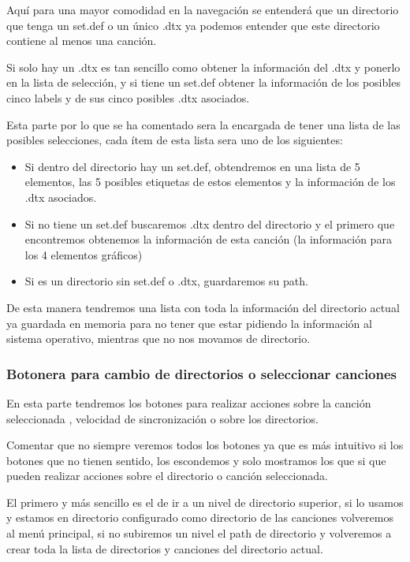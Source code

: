 \documentclass[a4paper,11pt,oneside]{book}
\begin{document}
Aquí para una mayor comodidad en la navegación se entenderá que un directorio que tenga un set.def o un único .dtx ya podemos entender que este directorio contiene al menos una canción.

Si solo hay un .dtx es tan sencillo como obtener la información del .dtx y ponerlo en la lista de selección, y si tiene un set.def obtener la información de los posibles cinco labels y de sus cinco posibles .dtx asociados.

Esta parte por lo que se ha comentado sera la encargada de tener una lista de las posibles selecciones, cada ítem de esta lista sera uno de los siguientes:


\begin{itemize}
   \item Si dentro del directorio hay un set.def, obtendremos en una lista de 5 elementos, las 5 posibles etiquetas de estos elementos y la información de los .dtx asociados.
   \item Si no tiene un set.def buscaremos .dtx dentro del directorio y el primero que encontremos obtenemos la información de esta canción (la información para los 4 elementos gráficos)
   \item Si es un directorio sin set.def o .dtx, guardaremos su path.
 \end{itemize}
 
 
De esta manera tendremos una lista con toda la información del directorio actual ya guardada en memoria para no tener que estar pidiendo la información al sistema operativo, mientras que no nos movamos de directorio.

\subsubsection{Botonera para cambio de directorios o seleccionar canciones}
En esta parte tendremos los botones para realizar acciones sobre la canción seleccionada , velocidad de sincronización o sobre los directorios.

Comentar que no siempre veremos todos los botones ya que es más intuitivo si los botones que no tienen sentido, los escondemos y solo mostramos los que si que pueden realizar acciones sobre el directorio o canción seleccionada.

El primero y más sencillo es el de ir a un nivel de directorio superior, si lo usamos y estamos en directorio configurado como directorio de las canciones volveremos al menú principal, si no subiremos un nivel el path de directorio y volveremos a crear toda la lista de directorios y canciones del directorio actual.
\end{document}
